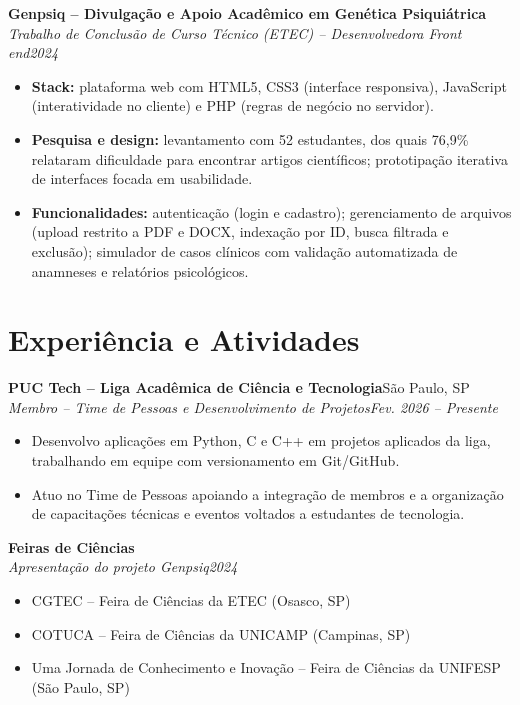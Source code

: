 \documentclass[a4paper,11pt]{article}
\newcommand{\entry}[4]{%
  \vspace{3pt}
  \noindent\textbf{#1}\hfill #2\\
  \textit{#3}\hfill\textit{#4}\par
}
\begin{document}
\entry{Genpsiq -- Divulgação e Apoio Acadêmico em Genética Psiquiátrica}{}
  {Trabalho de Conclusão de Curso Técnico (ETEC) -- Desenvolvedora Front end}{2024}
\begin{itemize}
  \item \textbf{Stack:} plataforma web com HTML5, CSS3 (interface responsiva),
        JavaScript (interatividade no cliente) e PHP (regras de negócio no servidor).
  \item \textbf{Pesquisa e design:} levantamento com 52 estudantes, dos quais 76,9\%
        relataram dificuldade para encontrar artigos científicos; prototipação
        iterativa de interfaces focada em usabilidade.
  \item \textbf{Funcionalidades:} autenticação (login e cadastro); gerenciamento de
        arquivos (upload restrito a PDF e DOCX, indexação por ID, busca filtrada e
        exclusão); simulador de casos clínicos com validação automatizada de
        anamneses e relatórios psicológicos.
\end{itemize}

\section{Experiência e Atividades}

\entry{PUC Tech -- Liga Acadêmica de Ciência e Tecnologia}{São Paulo, SP}
  {Membro -- Time de Pessoas e Desenvolvimento de Projetos}{Fev. 2026 -- Presente}
\begin{itemize}
  \item Desenvolvo aplicações em Python, C e C++ em projetos aplicados da liga,
        trabalhando em equipe com versionamento em Git/GitHub.
  \item Atuo no Time de Pessoas apoiando a integração de membros e a organização de
        capacitações técnicas e eventos voltados a estudantes de tecnologia.
\end{itemize}

\entry{Feiras de Ciências}{}{Apresentação do projeto Genpsiq}{2024}
\begin{itemize}
  \item CGTEC -- Feira de Ciências da ETEC (Osasco, SP)
  \item COTUCA -- Feira de Ciências da UNICAMP (Campinas, SP)
  \item Uma Jornada de Conhecimento e Inovação -- Feira de Ciências da UNIFESP (São Paulo, SP)
\end{itemize}
\end{document}
